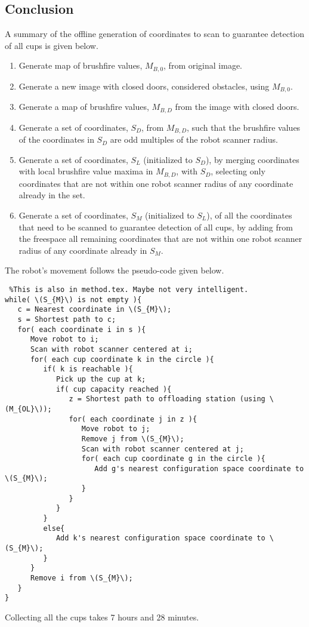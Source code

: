 \subsection{Conclusion}

A summary of the offline generation of coordinates to scan to guarantee detection of all cups is given below.

\begin{enumerate}
\item Generate map of brushfire values, \(M_{B,0}\), from original image.
\item Generate a new image with closed doors, considered obstacles, using \(M_{B,0}\).
\item Generate a map of brushfire values, \(M_{B,D}\) from the image with closed doors.
\item Generate a set of coordinates, \(S_{D}\), from \(M_{B,D}\),
such that the brushfire values of the coordinates in \(S_{D}\) are odd multiples of the robot scanner radius.
\item Generate a set of coordinates, \(S_{L}\) (initialized to \(S_{D}\)), by merging coordinates with local brushfire value maxima
in \(M_{B,D}\), with \(S_{D}\), selecting only coordinates that are not within one robot scanner radius
of any coordinate already in the set.
\item Generate a set of coordinates, \(S_{M}\) (initialized to \(S_{L}\)), of all the coordinates that need to be scanned
to guarantee detection of all cups, by adding from the freespace all remaining coordinates
that are not within one robot scanner radius of any coordinate already in \(S_{M}\).
\end{enumerate}

The robot's movement follows the pseudo-code given below.

\begin{verbatim} %This is also in method.tex. Maybe not very intelligent.
while( \(S_{M}\) is not empty ){
   c = Nearest coordinate in \(S_{M}\);
   s = Shortest path to c;
   for( each coordinate i in s ){
      Move robot to i;
      Scan with robot scanner centered at i;
      for( each cup coordinate k in the circle ){
         if( k is reachable ){
            Pick up the cup at k;
            if( cup capacity reached ){
               z = Shortest path to offloading station (using \(M_{OL}\));
               for( each coordinate j in z ){
                  Move robot to j;
                  Remove j from \(S_{M}\);
                  Scan with robot scanner centered at j;
                  for( each cup coordinate g in the circle ){
                     Add g's nearest configuration space coordinate to \(S_{M}\);
                  }
               }
            }
         }
         else{
            Add k's nearest configuration space coordinate to \(S_{M}\);
         }
      }
      Remove i from \(S_{M}\);
   }
}
\end{verbatim}

Collecting all the cups takes 7 hours and 28 minutes.
